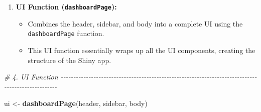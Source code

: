 \documentclass[
]{book}
\newenvironment{Shaded}{\begin{snugshade}}{\end{snugshade}}
\newcommand{\AttributeTok}[1]{\textcolor[rgb]{0.13,0.29,0.53}{#1}}
\newcommand{\CommentTok}[1]{\textcolor[rgb]{0.56,0.35,0.01}{\textit{#1}}}
\newcommand{\FunctionTok}[1]{\textcolor[rgb]{0.13,0.29,0.53}{\textbf{#1}}}
\newcommand{\NormalTok}[1]{#1}
\newcommand{\OtherTok}[1]{\textcolor[rgb]{0.56,0.35,0.01}{#1}}
\newcommand{\SpecialCharTok}[1]{\textcolor[rgb]{0.81,0.36,0.00}{\textbf{#1}}}
\newcommand{\StringTok}[1]{\textcolor[rgb]{0.31,0.60,0.02}{#1}}
\providecommand{\tightlist}{%
  \setlength{\itemsep}{0pt}\setlength{\parskip}{0pt}}
\begin{document}
\begin{Shaded}
\end{Shaded}

\begin{enumerate}
\def\labelenumi{\arabic{enumi}.}
\setcounter{enumi}{3}
\tightlist
\item
  \textbf{UI Function (\texttt{dashboardPage}):}

  \begin{itemize}
  \tightlist
  \item
    Combines the header, sidebar, and body into a complete UI using the \texttt{dashboardPage} function.
  \item
    This UI function essentially wraps up all the UI components, creating the structure of the Shiny app.
  \end{itemize}
\end{enumerate}

\begin{Shaded}
\begin{Highlighting}[]
\CommentTok{\# 4. UI Function {-}{-}{-}{-}{-}{-}{-}{-}{-}{-}{-}{-}{-}{-}{-}{-}{-}{-}{-}{-}{-}{-}{-}{-}{-}{-}{-}{-}{-}{-}{-}{-}{-}{-}{-}{-}{-}{-}{-}{-}{-}{-}{-}{-}{-}{-}{-}{-}{-}{-}{-}{-}{-}{-}{-}{-}{-}{-}{-}{-}{-}{-}{-}{-}{-}{-}{-}{-}{-}{-}{-}{-}{-}{-}{-}{-}{-}{-}{-}{-}{-}{-}{-}{-}{-}{-}{-}{-}{-}{-}{-}{-}{-}{-}{-}{-}{-}{-}{-}}

\NormalTok{ui }\OtherTok{\textless{}{-}} \FunctionTok{dashboardPage}\NormalTok{(header, sidebar, body)}
\end{Highlighting}
\end{Shaded}
\end{document}
